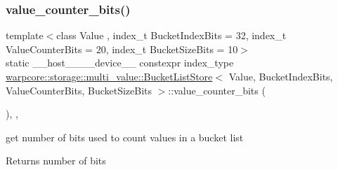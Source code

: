 \subsubsection{\texorpdfstring{value\+\_\+counter\+\_\+bits()}{value\_counter\_bits()}}
{\footnotesize\ttfamily template$<$class Value , index\+\_\+t Bucket\+Index\+Bits = 32, index\+\_\+t Value\+Counter\+Bits = 20, index\+\_\+t Bucket\+Size\+Bits = 10$>$ \\
static \+\_\+\+\_\+host\+\_\+\+\_\+\+\_\+\+\_\+device\+\_\+\+\_\+ constexpr index\+\_\+type \hyperlink{classwarpcore_1_1storage_1_1multi__value_1_1BucketListStore}{warpcore\+::storage\+::multi\+\_\+value\+::\+Bucket\+List\+Store}$<$ Value, Bucket\+Index\+Bits, Value\+Counter\+Bits, Bucket\+Size\+Bits $>$\+::value\+\_\+counter\+\_\+bits (\begin{DoxyParamCaption}{ }\end{DoxyParamCaption})\hspace{0.3cm}{\ttfamily [inline]}, {\ttfamily [static]}, {\ttfamily [noexcept]}}



get number of bits used to count values in a bucket list 

\begin{DoxyReturn}{Returns}
number of bits 
\end{DoxyReturn}
